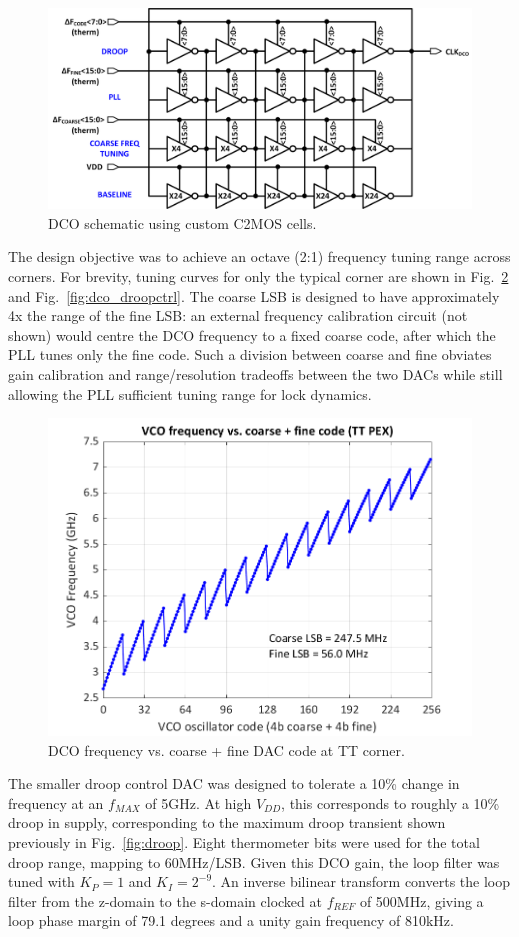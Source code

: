 \documentclass[twoside,9pt,journal,letterpage]{IEEEtran}
\begin{document}
\begin{figure}[h]
	\centering
	\includegraphics[width=0.9\columnwidth]{fig_dco}
	\caption{DCO schematic using custom C2MOS cells.}
	\label{fig:dco}
\end{figure}

The design objective was to achieve an octave (2:1) frequency tuning range across corners. For brevity, tuning curves for only the typical corner are shown in Fig.\ \ref{fig:dco_oscctrl} and Fig.\ \ref{fig:dco_droopctrl}. The coarse LSB is designed to have approximately 4x the range of the fine LSB: an external frequency calibration circuit (not shown) would centre the DCO frequency to a fixed coarse code, after which the PLL tunes only the fine code. Such a division between coarse and fine obviates gain calibration and range/resolution tradeoffs between the two DACs while still allowing the PLL sufficient tuning range for lock dynamics. 

\begin{figure}[h]
	\centering
	\includegraphics[width=0.7\columnwidth]{fig_dco_oscctrl}
	\caption{DCO frequency vs. coarse + fine DAC code at TT corner.}
	\label{fig:dco_oscctrl}
\end{figure}

The smaller droop control DAC was designed to tolerate a 10\% change in frequency at an $f_{MAX}$ of 5GHz. At high $V_{DD}$, this corresponds to roughly a 10\% droop in supply, corresponding to the maximum droop transient shown previously in Fig.\ \ref{fig:droop}. Eight thermometer bits were used for the total droop range, mapping to 60MHz/LSB. Given this DCO gain, the loop filter was tuned with $K_{P}=1$ and $K_{I}=2^{-9}$. An inverse bilinear transform converts the loop filter from the z-domain to the s-domain clocked at $f_{REF}$ of 500MHz, giving a loop phase margin of 79.1 degrees and a unity gain frequency of 810kHz.
\end{document}
